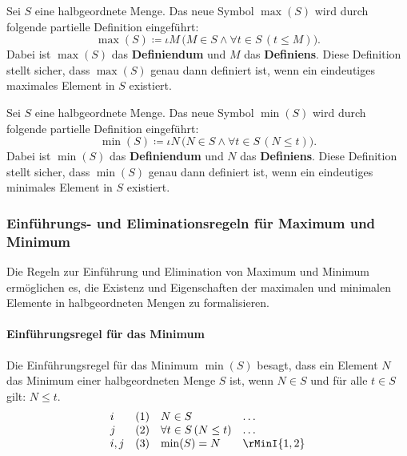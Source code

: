 \documentclass[main.tex]{subfiles}
\begin{document}
\begin{definition}[Maximum]
    Sei \( S \) eine halbgeordnete Menge. Das neue Symbol \(\max(S)\) wird durch folgende partielle Definition eingeführt:
    \[
    \max(S) \coloneqq \iota M \, \big(M \in S \land \forall t \in S \, (t \leq M)\big).
    \]
    Dabei ist \(\max(S)\) das \textbf{Definiendum} und \( M \) das \textbf{Definiens}. Diese Definition stellt sicher, dass \(\max(S)\) genau dann definiert ist, wenn ein eindeutiges maximales Element in \( S \) existiert.
\end{definition}

\begin{definition}[Minimum]
    Sei \( S \) eine halbgeordnete Menge. Das neue Symbol \(\min(S)\) wird durch folgende partielle Definition eingeführt:
    \[
    \min(S) \coloneqq \iota N \, \big(N \in S \land \forall t \in S \, (N \leq t)\big).
    \]
    Dabei ist \(\min(S)\) das \textbf{Definiendum} und \( N \) das \textbf{Definiens}. Diese Definition stellt sicher, dass \(\min(S)\) genau dann definiert ist, wenn ein eindeutiges minimales Element in \( S \) existiert.
\end{definition}

\subsubsection{Einführungs- und Eliminationsregeln für Maximum und Minimum}
\label{rule:rMaxI} \label{rule:rMaxE} \label{rule:rMinI} \label{rule:rMxInLbxInAMidPLpxRpRbEqvxInAAndPLpxRp}

Die Regeln zur Einführung und Elimination von Maximum und Minimum ermöglichen es, die Existenz und Eigenschaften der maximalen und minimalen Elemente in halbgeordneten Mengen zu formalisieren.

\paragraph{Einführungsregel für das Minimum}
Die Einführungsregel für das Minimum \(\min(S)\) besagt, dass ein Element \(N\) das Minimum einer halbgeordneten Menge \(S\) ist, wenn \(N \in S\) und für alle \(t \in S\) gilt: \(N \leq t\).
\[
\begin{array}{llll}
    i   & (1) & N \in S & \dots \\
    j   & (2) & \forall t \in S \, (N \leq t) & \dots \\
    i,j & (3) & \min(S) = N & \rMinI{1,2}
\end{array}
\]
\end{document}
